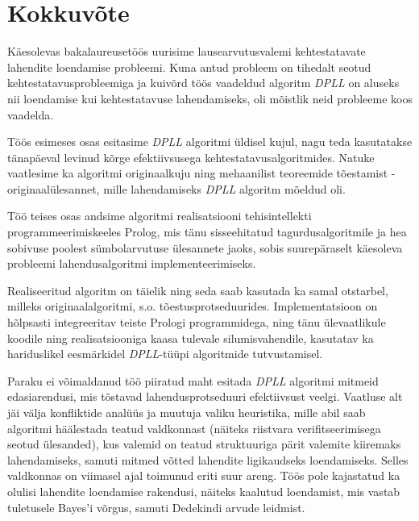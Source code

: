 \chapter*{Kokkuvõte}

Käesolevas bakalaureusetöös uurisime lausearvutusvalemi kehtestatavate
lahendite loendamise probleemi. Kuna antud probleem on tihedalt seotud
kehtestatavusprobleemiga ja kuivõrd töös vaadeldud algoritm
\textit{DPLL} on aluseks nii loendamise kui kehtestatavuse lahendamiseks, oli
mõistlik neid probleeme koos vaadelda.

Töös esimeses osas esitasime \textit{DPLL} algoritmi üldisel kujul, nagu teda
kasutatakse tänapäeval levinud kõrge efektiivsusega kehtestatavusalgoritmides.
Natuke vaatlesime ka algoritmi originaalkuju ning mehaanilist teoreemide tõestamist -
originaalülesannet, mille lahendamiseks \textit{DPLL} algoritm mõeldud oli.

Töö teises osas andsime algoritmi realisatsiooni tehisintellekti
programmeerimiskeeles Prolog, mis tänu sisseehitatud tagurdusalgoritmile ja
hea sobivuse poolest sümbolarvutuse ülesannete jaoks, sobis suurepäraselt
käesoleva probleemi lahendusalgoritmi implementeerimiseks.

Realiseeritud algoritm on täielik ning seda saab kasutada ka samal otstarbel,
milleks originaalalgoritmi, s.o. tõestusprotseduurides. Implementatsioon on
hõlpsasti integreeritav teiste Prologi programmidega, ning tänu ülevaatlikule
koodile ning realisatsiooniga kaasa tulevale silumisvahendile, kasutatav ka
hariduslikel eesmärkidel \textit{DPLL}-tüüpi algoritmide tutvustamisel.

Paraku ei võimaldanud töö piiratud maht esitada \textit{DPLL} algoritmi mitmeid
edasiarendusi, mis tõstavad lahendusprotseduuri efektiivsust veelgi. Vaatluse
alt jäi välja konfliktide analüüs ja muutuja valiku heuristika, mille abil saab
algoritmi häälestada teatud valdkonnast (näiteks riistvara verifitseerimisega
seotud ülesanded), kus valemid on teatud struktuuriga pärit valemite kiiremaks
lahendamiseks, samuti mitmed võtted lahendite ligikaudseks loendamiseks. Selles
valdkonnas on viimasel ajal toimunud eriti suur areng. Töös pole kajastatud ka
olulisi lahendite loendamise rakendusi, näiteks kaalutud loendamist, mis vastab
tuletusele Bayes'i võrgus, samuti Dedekindi arvude leidmist.
